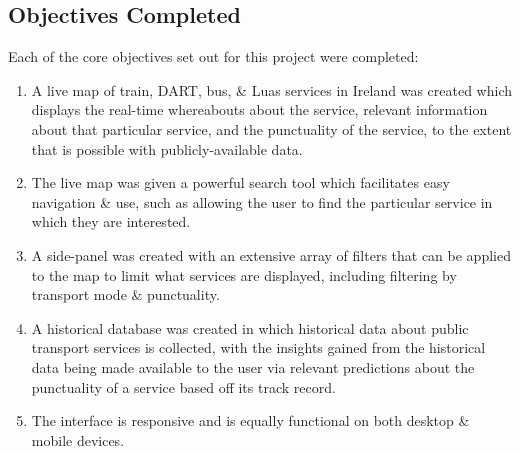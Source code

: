 \documentclass[a4paper,11pt]{report}
\begin{document}
\subsection{Objectives Completed}
Each of the core objectives set out for this project were completed:
\begin{enumerate}
    \item   A live map of train, DART, bus, \& Luas services in Ireland was created which displays the real-time whereabouts about the service, relevant information about that particular service, and the punctuality of the service, to the extent that is possible with publicly-available data.

    \item   The live map was given a powerful search tool which facilitates easy navigation \& use, such as allowing the user to find the particular service in which they are interested.

    \item   A side-panel was created with an extensive array of filters that can be applied to the map to limit what services are displayed, including filtering by transport mode \& punctuality.

    \item   A historical database was created in which historical data about public transport services is collected, with the insights gained from the historical data being made available to the user via relevant predictions about the punctuality of a service based off its track record.

    \item   The interface is responsive and is equally functional on both desktop \& mobile devices.
\end{enumerate}
\end{document}
